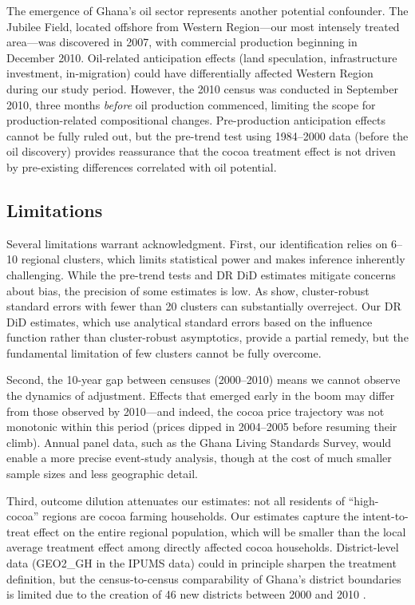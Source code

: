 \documentclass[12pt]{article}
\begin{document}
The emergence of Ghana's oil sector represents another potential confounder. The Jubilee Field, located offshore from Western Region---our most intensely treated area---was discovered in 2007, with commercial production beginning in December 2010. Oil-related anticipation effects (land speculation, infrastructure investment, in-migration) could have differentially affected Western Region during our study period. However, the 2010 census was conducted in September 2010, three months \textit{before} oil production commenced, limiting the scope for production-related compositional changes. Pre-production anticipation effects cannot be fully ruled out, but the pre-trend test using 1984--2000 data (before the oil discovery) provides reassurance that the cocoa treatment effect is not driven by pre-existing differences correlated with oil potential.

\subsection{Limitations}

Several limitations warrant acknowledgment. First, our identification relies on 6--10 regional clusters, which limits statistical power and makes inference inherently challenging. While the pre-trend tests and DR DiD estimates mitigate concerns about bias, the precision of some estimates is low. As \citet{cameron2008} show, cluster-robust standard errors with fewer than 20 clusters can substantially overreject. Our DR DiD estimates, which use analytical standard errors based on the influence function rather than cluster-robust asymptotics, provide a partial remedy, but the fundamental limitation of few clusters cannot be fully overcome.

Second, the 10-year gap between censuses (2000--2010) means we cannot observe the dynamics of adjustment. Effects that emerged early in the boom may differ from those observed by 2010---and indeed, the cocoa price trajectory was not monotonic within this period (prices dipped in 2004--2005 before resuming their climb). Annual panel data, such as the Ghana Living Standards Survey, would enable a more precise event-study analysis, though at the cost of much smaller sample sizes and less geographic detail.

Third, outcome dilution attenuates our estimates: not all residents of ``high-cocoa'' regions are cocoa farming households. Our estimates capture the intent-to-treat effect on the entire regional population, which will be smaller than the local average treatment effect among directly affected cocoa households. District-level data (GEO2\_GH in the IPUMS data) could in principle sharpen the treatment definition, but the census-to-census comparability of Ghana's district boundaries is limited due to the creation of 46 new districts between 2000 and 2010 \citep{jedwab2016}.
\end{document}
